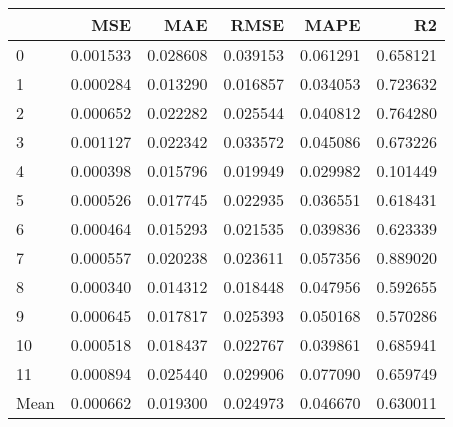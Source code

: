 \begin{tabular}{lrrrrr}
\toprule
 & MSE & MAE & RMSE & MAPE & R2 \\
\midrule
0 & 0.001533 & 0.028608 & 0.039153 & 0.061291 & 0.658121 \\
1 & 0.000284 & 0.013290 & 0.016857 & 0.034053 & 0.723632 \\
2 & 0.000652 & 0.022282 & 0.025544 & 0.040812 & 0.764280 \\
3 & 0.001127 & 0.022342 & 0.033572 & 0.045086 & 0.673226 \\
4 & 0.000398 & 0.015796 & 0.019949 & 0.029982 & 0.101449 \\
5 & 0.000526 & 0.017745 & 0.022935 & 0.036551 & 0.618431 \\
6 & 0.000464 & 0.015293 & 0.021535 & 0.039836 & 0.623339 \\
7 & 0.000557 & 0.020238 & 0.023611 & 0.057356 & 0.889020 \\
8 & 0.000340 & 0.014312 & 0.018448 & 0.047956 & 0.592655 \\
9 & 0.000645 & 0.017817 & 0.025393 & 0.050168 & 0.570286 \\
10 & 0.000518 & 0.018437 & 0.022767 & 0.039861 & 0.685941 \\
11 & 0.000894 & 0.025440 & 0.029906 & 0.077090 & 0.659749 \\
Mean & 0.000662 & 0.019300 & 0.024973 & 0.046670 & 0.630011 \\
\bottomrule
\end{tabular}
